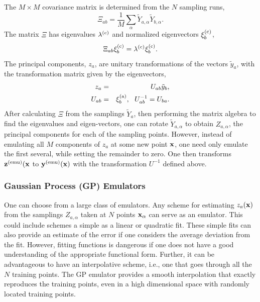 The $M\times M$ covariance matrix is determined from the $N$ sampling runs,
\begin{equation}
\Xi_{ab}=\frac{1}{M}\sum_\alpha \tilde{Y}_{a,\alpha}\tilde{Y}_{b,\alpha}.
\end{equation}
The matrix $\Xi$ has eigenvalues $\lambda^{\rm(c)}$ and normalized eigenvectors $\xi_b^{\rm(c)}$,
\begin{equation}
\label{eq:Xidef}
\Xi_{ab}\xi_b^{\rm(c)}=\lambda^{\rm(c)} \xi_b^{\rm(c)}.
\end{equation}
The principal components, $z_a$, are unitary transformations of the vectors $\tilde{y}_a$, with the transformation matrix given by the eigenvectors,
\begin{eqnarray}
\label{eq:pcarotation}
z_a&=&U_{ab} \tilde{y}_b,\\
\nonumber
U_{ab}&=&\xi_b^{\rm(a)},~~U^{-1}_{ab}=U_{ba}.
\end{eqnarray}
After calculating $\Xi$ from the samplings $\tilde{Y}_a$, then performing the matrix algebra to find the eigenvalues and eigen-vectors, one can rotate $\tilde{Y}_{a,\alpha}$ to obtain $Z_{a,\alpha}$, the principal components for each of the sampling points. However, instead of emulating all $M$ components of $z_a$ at some new point ${\bf x}$, one need only emulate the first several, while setting the remainder to zero. One then transforms ${\bf z}^{\rm(emu)}({\bf x}$ to ${\bf y}^{\rm(emu)}({\bf x})$ with the transformation $U^{-1}$ defined above.

\subsubsection{Gaussian Process (GP) Emulators}

One can choose from a large class of emulators. Any scheme for estimating $z_a({\bf x})$ from the samplings $Z_{a,\alpha}$ taken at $N$ points ${\bf x}_\alpha$ can serve as an emulator. This could include schemes a simple as a linear or quadratic fit. These simple fits can also provide an estimate of the error if one considers the average deviation from the fit. However, fitting functions is dangerous if one does not have a good understanding of the appropriate functional form. Further, it can be advantageous to have an interpolative scheme, i.e., one that goes through all the $N$ training points. The GP emulator provides a smooth interpolation that exactly reproduces the training points, even in a high dimensional space with randomly located training points.

